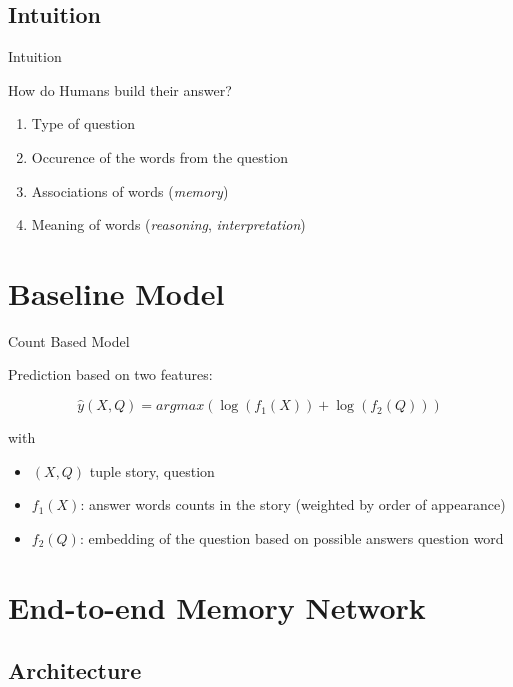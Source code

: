 \documentclass[pdf]{beamer}
\begin{document}
\subsection{Intuition}

\begin{frame}{Intuition}

How do Humans build their answer?

\begin{enumerate}
	\item Type of question
	\item Occurence of the words from the question
	\item Associations of words (\textit{memory})
	\item Meaning of words (\textit{reasoning}, \textit{interpretation})
\end{enumerate}

\end{frame}

\section{Baseline Model}

\begin{frame}{Count Based Model}

Prediction based on two features:

\[
\hat{y}(X,Q) = argmax(\log(f_1(X)) + \log(f_2(Q)))
\]

with 

\begin{itemize}
	\item $(X, Q)$ tuple story, question
	\item $f_1(X)$: answer words counts in the story (weighted by order of appearance)
	\item $f_2(Q)$: embedding of the question based on possible answers question word
\end{itemize}

\end{frame}

\section{End-to-end Memory Network}
\subsection{Architecture}
\end{document}
